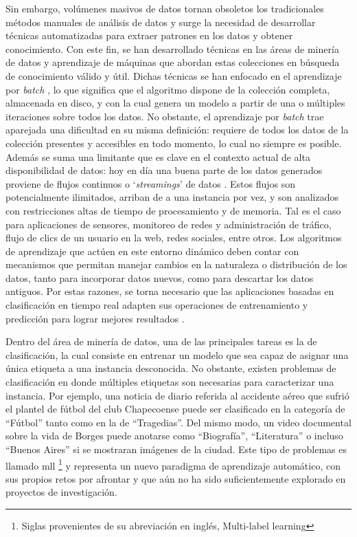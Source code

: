 Sin embargo, volúmenes masivos de datos tornan obsoletos los tradicionales
métodos manuales de análisis de datos y surge la necesidad de desarrollar
técnicas automatizadas para extraer patrones en los datos y obtener
conocimiento. Con este fin, se han desarrollado técnicas en las áreas de minería
de datos y aprendizaje de máquinas que abordan estas colecciones en búsqueda de
conocimiento válido y útil. Dichas técnicas se han enfocado en el aprendizaje
por \textit{batch} \cite{gama_knowledge_2010}, lo que significa que el algoritmo
dispone de la colección completa, almacenada en disco, y con la cual genera un
modelo a partir de una o múltiples iteraciones sobre todos los datos. No
obstante, el aprendizaje por \textit{batch} trae aparejada una dificultad en su
misma definición: requiere de todos los datos de la colección presentes y
accesibles en todo momento,  lo cual no siempre es posible. Además se suma una
limitante que es clave en el contexto actual de alta disponibilidad de datos:
hoy en día una buena parte de los datos generados proviene de flujos continuos o
‘\textit{streamings}’ de datos \cite{bifet_big_2014}. Estos flujos son
potencialmente ilimitados, arriban de a una instancia por vez, y son analizados
con restricciones altas de tiempo de procesamiento y de memoria.  Tal es el caso
para aplicaciones de sensores, monitoreo de redes y administración de tráfico,
flujo de clics de un usuario en la web, redes sociales, entre otros.  Los
algoritmos de aprendizaje que actúen en este entorno dinámico deben contar con
mecanismos que permitan manejar cambios en la naturaleza o distribución de los
datos, tanto para incorporar datos nuevos, como para descartar los datos
antiguos. Por estas razones, se torna necesario que las aplicaciones basadas en
clasificación en tiempo real adapten sus operaciones de entrenamiento y
predicción para lograr mejores resultados \cite{sousa_multi-label_2018}.

Dentro del área de minería de datos, una de las principales tareas es la de
clasificación, la cual consiste en entrenar un modelo que sea capaz de asignar
una única etiqueta a una instancia desconocida. No obstante, existen problemas
de clasificación en donde múltiples etiquetas son necesarias para caracterizar
una instancia. Por ejemplo, una noticia de diario referida al accidente aéreo
que sufrió el plantel de fútbol del club Chapecoense puede ser clasificado en la
categoría de “Fútbol” tanto como en la de “Tragedias”. Del mismo modo, un video
documental sobre la vida de Borges puede anotarse como “Biografía”, “Literatura”
o incluso “Buenos Aires” si se mostraran imágenes de la ciudad. Este tipo de
problemas es llamado \acrfull{mll} \footnote{Siglas provenientes de su
abreviación en inglés, Multi-label learning} y representa un nuevo paradigma de
aprendizaje automático, con sus propios retos por afrontar y que aún no ha sido
suficientemente explorado en proyectos de investigación. 

